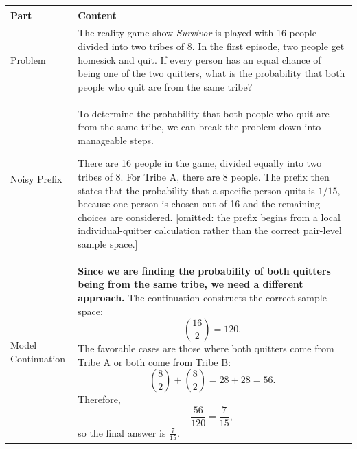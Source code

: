 \begin{minipage}{\TableWidth}
\small
\begin{tabularx}{\linewidth}{@{}L{1.25in}Y@{}}
\toprule
Part & Content \\
\midrule
Problem & The reality game show \emph{Survivor} is played with 16 people divided into two tribes of 8. In the first episode, two people get homesick and quit. If every person has an equal chance of being one of the two quitters, what is the probability that both people who quit are from the same tribe? \\
\addlinespace
Noisy Prefix & To determine the probability that both people who quit are from the same tribe, we can break the problem down into manageable steps.

There are 16 people in the game, divided equally into two tribes of 8. For Tribe A, there are 8 people. The prefix then states that \textcolor{DenoiseRed}{the probability that a specific person quits is \(1/15\), because one person is chosen out of 16 and the remaining choices are considered}. [omitted: the prefix begins from a local individual-quitter calculation rather than the correct pair-level sample space.] \\
\addlinespace
Model Continuation & \textbf{Since we are finding the probability of both quitters being from the same tribe, we need a different approach.} The continuation constructs the correct sample space:
\[
\binom{16}{2}=120.
\]
The favorable cases are those where both quitters come from Tribe A or both come from Tribe B:
\[
\binom{8}{2}+\binom{8}{2}=28+28=56.
\]
Therefore,
\[
\frac{56}{120}=\frac{7}{15},
\]
so the final answer is \(\boxed{\frac{7}{15}}\). \\
\bottomrule
\end{tabularx}
\end{minipage}

